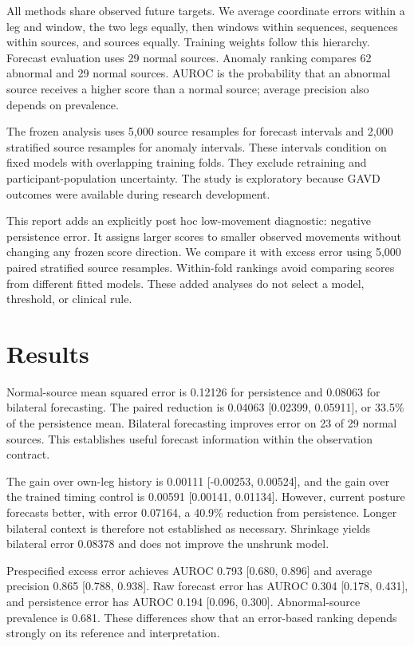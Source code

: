 \documentclass[letterpaper]{article}
\begin{document}
All methods share observed future targets. We average coordinate errors within a leg and window, the two legs equally, then windows within sequences, sequences within sources, and sources equally. Training weights follow this hierarchy. Forecast evaluation uses 29 normal sources. Anomaly ranking compares 62 abnormal and 29 normal sources. AUROC is the probability that an abnormal source receives a higher score than a normal source; average precision also depends on prevalence.

The frozen analysis uses 5,000 source resamples for forecast intervals and 2,000 stratified source resamples for anomaly intervals. These intervals condition on fixed models with overlapping training folds. They exclude retraining and participant-population uncertainty. The study is exploratory because GAVD outcomes were available during research development.

This report adds an explicitly post hoc low-movement diagnostic: negative persistence error. It assigns larger scores to smaller observed movements without changing any frozen score direction. We compare it with excess error using 5,000 paired stratified source resamples. Within-fold rankings avoid comparing scores from different fitted models. These added analyses do not select a model, threshold, or clinical rule.

\section{Results}

Normal-source mean squared error is 0.12126 for persistence and 0.08063 for bilateral forecasting. The paired reduction is 0.04063 [0.02399, 0.05911], or 33.5\% of the persistence mean. Bilateral forecasting improves error on 23 of 29 normal sources. This establishes useful forecast information within the observation contract.

The gain over own-leg history is 0.00111 [-0.00253, 0.00524], and the gain over the trained timing control is 0.00591 [0.00141, 0.01134]. However, current posture forecasts better, with error 0.07164, a 40.9\% reduction from persistence. Longer bilateral context is therefore not established as necessary. Shrinkage yields bilateral error 0.08378 and does not improve the unshrunk model.

Prespecified excess error achieves AUROC 0.793 [0.680, 0.896] and average precision 0.865 [0.788, 0.938]. Raw forecast error has AUROC 0.304 [0.178, 0.431], and persistence error has AUROC 0.194 [0.096, 0.300]. Abnormal-source prevalence is 0.681. These differences show that an error-based ranking depends strongly on its reference and interpretation.
\end{document}
